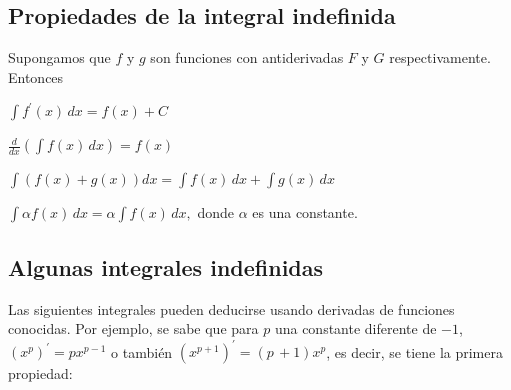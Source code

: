 \subsection{Propiedades de la integral indefinida}
Supongamos que $f$ y $g$ son funciones con antiderivadas $F$ y $G$ respectivamente. Entonces
\begin{parrafonumerado}
\item $\displaystyle{\int f^{\prime }(x)\,dx=f(x)+C}$

\item $\displaystyle{\frac{d}{dx}\left(\int f(x)\,dx\right)=f(x)}$

\item $\displaystyle{\int \left(f(x)+g(x)\right)dx=\int f(x)\,dx+\int g(x)\,dx}$

\item $\displaystyle{\int \alpha f(x)\,dx=\alpha \int f(x)\,dx},$ donde $\alpha $ es una constante.
\end{parrafonumerado}

\subsection{Algunas integrales indefinidas}
Las siguientes integrales pueden deducirse usando derivadas de funciones conocidas. Por ejemplo, se sabe que para $p$ una constante diferente de $-1$, $(x^p)^\prime=px^{p-1}$ o también $(x^{p+1})^\prime=(p\,+1)x^{p}$, es decir, se tiene la primera propiedad:

